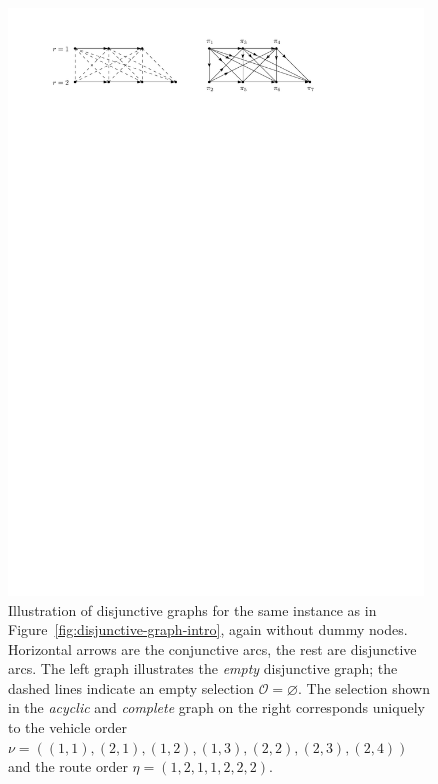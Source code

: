 \documentclass[a4paper]{report}
\theoremstyle{definition}
\theoremstyle{plain}
\begin{document}
\begin{figure}
  \centering
  \includegraphics[width=0.98\textwidth]{figures/single/disjunctive_graph.pdf}
  \caption{Illustration of disjunctive graphs for the same instance as in
    Figure~\ref{fig:disjunctive-graph-intro}, again without dummy nodes. Horizontal arrows are the conjunctive
    arcs, the rest are disjunctive arcs. The left graph illustrates the \textit{empty}
    disjunctive graph; the dashed lines indicate an empty selection
    $\mathcal{O} = \varnothing$. The selection shown in the \emph{acyclic} and \emph{complete} graph on the
    right corresponds uniquely to the vehicle order
    $\nu = ((1,1), (2,1), (1,2), (1,3), (2,2), (2,3), (2,4))$ and the route order
    $\eta = (1, 2, 1, 1, 2, 2, 2)$.}\label{fig:disjunctive-graphs}
\end{figure}
\end{document}
